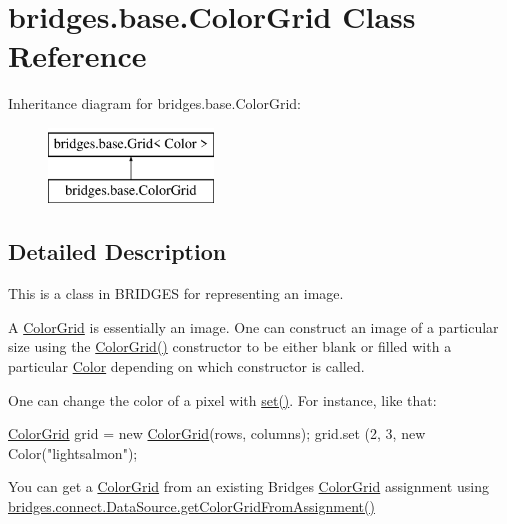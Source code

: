 \hypertarget{classbridges_1_1base_1_1_color_grid}{}\section{bridges.\+base.\+Color\+Grid Class Reference}
\label{classbridges_1_1base_1_1_color_grid}
Inheritance diagram for bridges.\+base.\+Color\+Grid\+:\begin{figure}[H]
\begin{center}
\leavevmode
\includegraphics[height=2.000000cm]{classbridges_1_1base_1_1_color_grid}
\end{center}
\end{figure}


\subsection{Detailed Description}
This is a class in B\+R\+I\+D\+G\+ES for representing an image. 

A \hyperlink{classbridges_1_1base_1_1_color_grid}{Color\+Grid} is essentially an image. One can construct an image of a particular size using the \hyperlink{classbridges_1_1base_1_1_color_grid_af434a5a3dcbaf86e51ac6f9e1c1d7e5f}{Color\+Grid()} constructor to be either blank or filled with a particular \hyperlink{classbridges_1_1base_1_1_color}{Color} depending on which constructor is called.

One can change the color of a pixel with \hyperlink{classbridges_1_1base_1_1_grid_ab79ceb737423bb28ea2348e61a625a17}{set()}. For instance, like that\+: 
\begin{DoxyCode}
\hyperlink{classbridges_1_1base_1_1_color_grid_af434a5a3dcbaf86e51ac6f9e1c1d7e5f}{ColorGrid} grid = \textcolor{keyword}{new} \hyperlink{classbridges_1_1base_1_1_color_grid_af434a5a3dcbaf86e51ac6f9e1c1d7e5f}{ColorGrid}(rows, columns);
grid.set (2, 3, \textcolor{keyword}{new} Color(\textcolor{stringliteral}{"lightsalmon"});
\end{DoxyCode}


You can get a \hyperlink{classbridges_1_1base_1_1_color_grid}{Color\+Grid} from an existing Bridges \hyperlink{classbridges_1_1base_1_1_color_grid}{Color\+Grid} assignment using \hyperlink{classbridges_1_1connect_1_1_data_source_a9556950d89b39ce61bead0879d1e2192}{bridges.\+connect.\+Data\+Source.\+get\+Color\+Grid\+From\+Assignment()}

